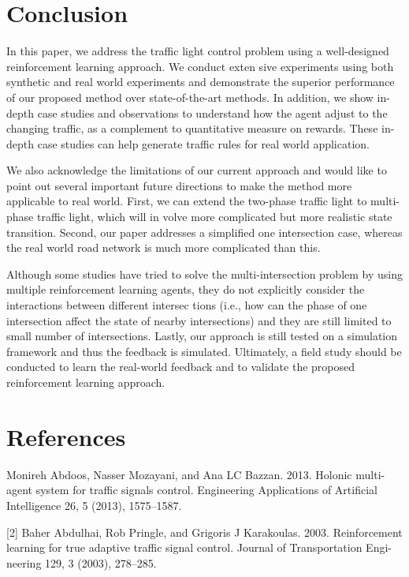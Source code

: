 \documentclass{article}
\begin{document}
\section{Conclusion}
\quad In this paper, we address the traffic light control problem using a
well-designed reinforcement learning approach. We conduct exten
sive experiments using both synthetic and real world experiments
and demonstrate the superior performance of our proposed method
over state-of-the-art methods. In addition, we show in-depth case
studies and observations to understand how the agent adjust to
the changing traffic, as a complement to quantitative measure on
rewards. These in-depth case studies can help generate traffic rules
for real world application.

We also acknowledge the limitations of our current approach
and would like to point out several important future directions to
make the method more applicable to real world. First, we can extend
the two-phase traffic light to multi-phase traffic light, which will in
volve more complicated but more realistic state transition. Second,
our paper addresses a simplified one intersection case, whereas
the real world road network is much more complicated than this.

Although some studies have tried to solve the multi-intersection
problem by using multiple reinforcement learning agents, they do
not explicitly consider the interactions between different intersec
tions (i.e., how can the phase of one intersection affect the state of
nearby intersections) and they are still limited to small number of
intersections. Lastly, our approach is still tested on a simulation
framework and thus the feedback is simulated. Ultimately, a field
study should be conducted to learn the real-world feedback and to
validate the proposed reinforcement learning approach.

\section{References}

\quad [1] Monireh Abdoos, Nasser Mozayani, and Ana LC Bazzan. 2013. Holonic multi-
agent system for traffic signals control. Engineering Applications of Artificial
Intelligence 26, 5 (2013), 1575–1587.

[2] Baher Abdulhai, Rob Pringle, and Grigoris J Karakoulas. 2003. Reinforcement
learning for true adaptive traffic signal control. Journal of Transportation Engi-
neering 129, 3 (2003), 278–285.
\end{document}
